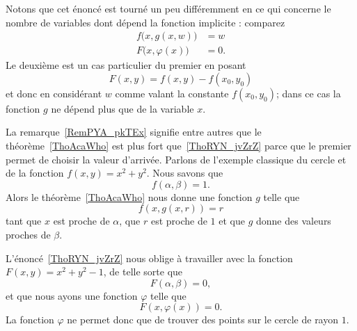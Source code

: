 \begin{remark}\label{RemPYA_pkTEx}
    Notons que cet énoncé est tourné un peu différemment en ce qui concerne le nombre de variables dont dépend la fonction implicite : comparez
    \begin{subequations}
        \begin{align}
            f\big( x,g(x,w) \big)       & = w     \\
            F\big( x,\varphi(x) \big)   & = 0.
        \end{align}
    \end{subequations}
    Le deuxième est un cas particulier du premier en posant
    \begin{equation}
        F(x,y)=f(x,y)-f(x_0,y_0)
    \end{equation}
    et donc en considérant \( w\) comme valant la constante \( f(x_0,y_0)\); dans ce cas la fonction \( g\) ne dépend plus que de la variable \( x\).
\end{remark}

\begin{example}
    La remarque~\ref{RemPYA_pkTEx} signifie entre autres que le théorème~\ref{ThoAcaWho} est plus fort que~\ref{ThoRYN_jvZrZ} parce que le premier permet de choisir la valeur d'arrivée. Parlons de l'exemple classique du cercle et de la fonction \( f(x,y)=x^2+y^2\). Nous savons que
    \begin{equation}
        f(\alpha,\beta)=1.
    \end{equation}
    Alors le théorème~\ref{ThoAcaWho} nous donne une fonction \( g\) telle que
    \begin{equation}
        f(x,g(x,r))=r
    \end{equation}
    tant que \( x\) est proche de \( \alpha\), que \( r\) est proche de \( 1\) et que \( g\) donne des valeurs proches de \( \beta\).

    L'énoncé~\ref{ThoRYN_jvZrZ} nous oblige à travailler avec la fonction \( F(x,y)=x^2+y^2-1\), de telle sorte que
    \begin{equation}
        F(\alpha,\beta)=0,
    \end{equation}
    et que nous ayons une fonction \( \varphi\) telle que
    \begin{equation}
        F(x,\varphi(x))=0.
    \end{equation}
    La fonction \( \varphi\) ne permet donc que de trouver des points sur le cercle de rayon \( 1\).
\end{example}

